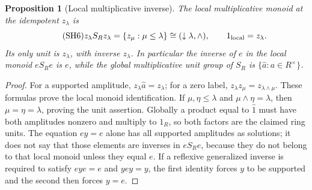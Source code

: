\documentclass[11pt,a4paper]{article}
\newtheorem{proposition}[theorem]{Proposition}
\theoremstyle{definition}\newtheorem{definition}[theorem]{Definition}
\begin{document}
\begin{proposition}[Local multiplicative inverse]\label{sh:localmult}
The local multiplicative monoid at the idempotent $z_\lambda$ is
\begin{equation}\tag{SH6}\label{sh:localmonoid}
 z_\lambda S_Rz_\lambda
 =\{z_\mu:\mu\le\lambda\}\cong(\downarrow\lambda,\wedge),
 \qquad 1_{\rm local}=z_\lambda .
\end{equation}
Its only unit is $z_\lambda$, with inverse $z_\lambda$.
In particular the inverse of $e$ in the local monoid $eS_Re$
is $e$, while the global multiplicative unit group of $S_R$
is $\{\widehat a:a\in R^\times\}$.
\end{proposition}
\begin{proof}
For a supported amplitude, $z_\lambda\widehat a=z_\lambda$;
for a zero label, $z_\lambda z_\mu=z_{\lambda\wedge\mu}$.
These formulas prove the local monoid identification.  If
$\mu,\eta\le\lambda$ and $\mu\wedge\eta=\lambda$, then
$\mu=\eta=\lambda$, proving the unit assertion. Globally a product
equal to $\widehat1$ must have both amplitudes nonzero and multiply
to $1_R$, so both factors are the claimed ring units.
The equation $ey=e$ alone has all supported amplitudes as solutions;
it does not say that those elements are inverses in $eS_Re$,
because they do not belong to that local monoid unless they equal
$e$. If a reflexive generalized inverse is required to satisfy
$eye=e$ and $yey=y$, the first identity forces $y$ to be supported
and the second then forces $y=e$.
\end{proof}
\end{document}
